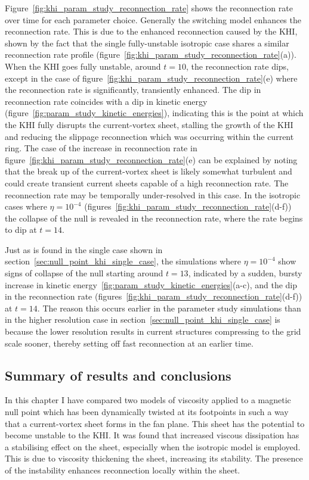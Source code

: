 Figure~\ref{fig:khi_param_study_reconnection_rate} shows the reconnection rate over time for each parameter choice. Generally the switching model enhances the reconnection rate. This is due to the enhanced reconnection caused by the KHI, shown by the fact that the single fully-unstable isotropic case shares a similar reconnection rate profile (figure~\ref{fig:khi_param_study_reconnection_rate}(a)). When the KHI goes fully unstable, around $t=10$, the reconnection rate dips, except in the case of figure~\ref{fig:khi_param_study_reconnection_rate}(e) where the reconnection rate is significantly, transiently enhanced. The dip in reconnection rate coincides with a dip in kinetic energy (figure~\ref{fig:param_study_kinetic_energies}), indicating this is the point at which the KHI fully disrupts the current-vortex sheet, stalling the growth of the KHI and reducing the slippage reconnection which was occurring within the current ring. The case of the increase in reconnection rate in figure~\ref{fig:khi_param_study_reconnection_rate}(e) can be explained by noting that the break up of the current-vortex sheet is likely somewhat turbulent and could create transient current sheets capable of a high reconnection rate. The reconnection rate may be temporally under-resolved in this case. In the isotropic cases where $\eta=10^{-4}$ (figures~\ref{fig:khi_param_study_reconnection_rate}(d-f)) the collapse of the null is revealed in the reconnection rate, where the rate begins to dip at $t=14$.

Just as is found in the single case shown in section~\ref{sec:null_point_khi_single_case}, the simulations where $\eta = 10^{-4}$ show signs of collapse of the null starting around $t=13$, indicated by a sudden, bursty increase in kinetic energy~\ref{fig:param_study_kinetic_energies}(a-c), and the dip in the reconnection rate (figures~\ref{fig:khi_param_study_reconnection_rate}(d-f)) at $t=14$. The reason this occurs earlier in the parameter study simulations than in the higher resolution case in section~\ref{sec:null_point_khi_single_case} is because the lower resolution results in current structures compressing to the grid scale sooner, thereby setting off fast reconnection at an earlier time. 

\subsection{Summary of results and conclusions}

In this chapter I have compared two models of viscosity applied to a magnetic null point which has been dynamically twisted at its footpoints in such a way that a current-vortex sheet forms in the fan plane. This sheet has the potential to become unstable to the KHI. It was found that increased viscous dissipation has a stabilising effect on the sheet, especially when the isotropic model is employed. This is due to viscosity thickening the sheet, increasing its stability. The presence of the instability enhances reconnection locally within the sheet.

